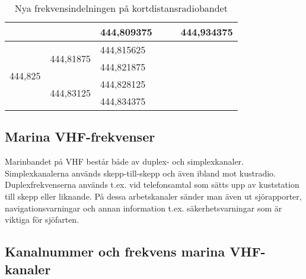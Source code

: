 \begin{table}[h]
\begin{tabular}{|l|l|l|l|l|l|}
		                                               &                                                 & 444,809375                      & \multicolumn{1}{l|}{}                         & \multicolumn{1}{l|}{}                           & \multicolumn{1}{l|}{444,934375} \\ \hline
		\multirow{4}{*}{444,825}                       & \multirow{2}{*}{444,81875}                      & 444,815625                      & \multicolumn{3}{l}{\multirow{4}{*}{}}                                                                                             \\ \cline{3-3}
		                                               &                                                 & 444,821875                      & \multicolumn{3}{l}{}                                                                                                              \\ \cline{2-3}
		                                               & \multirow{2}{*}{444,83125}                      & 444,828125                      & \multicolumn{3}{l}{}                                                                                                              \\ \cline{3-3}
		                                               &                                                 & 444,834375                      & \multicolumn{3}{l}{}                                                                                                              \\ \cline{1-3}
	\end{tabular}
\caption{Nya frekvensindelningen på kortdistansradiobandet}
\label{tab:SRBR-frekvenser}
\end{table}

\subsection{Marina VHF-frekvenser}

Marinbandet på VHF består både av duplex- och simplexkanaler. Simplexkanalerna
används skepp-till-skepp och även ibland mot kustradio. Duplexfrekvenserna
används t.ex. vid telefonsamtal som sätts upp av kuststation till skepp eller
liknande. På dessa arbetskanaler sänder man även ut sjörapporter,
navigationsvarningar och annan information t.ex. säkerhetsvarningar som är
viktiga för sjöfarten.

\subsection{Kanalnummer och frekvens marina VHF-kanaler}

